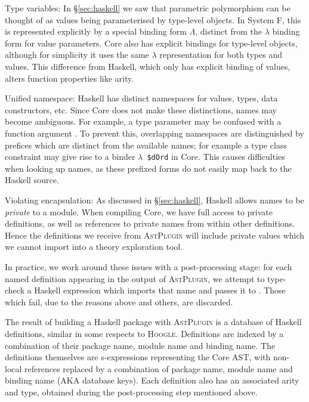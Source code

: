 \begin{description}
  \item{Type variables}: In \S \ref{sec:haskell} we saw that parametric polymorphism can be thought of as values being parameterised by type-level objects. In System F, this is represented explicitly by a special binding form $\Lambda$, distinct from the $\lambda$ binding form for value parameters. Core also has explicit bindings for type-level objects, although for simplicity it uses the same $\lambda$ representation for both types and values. This difference from Haskell, which only has explicit binding of values, alters function properties like arity.

  \item{Unified namespace}: Haskell has distinct namespaces for values, types, data constructors, etc. Since Core does not make these distinctions, names may become ambiguous. For example, a type parameter  may be confused with a function argument . To prevent this, overlapping namespaces are distinguished by prefices which are distinct from the available names; for example a type class constraint  may give rise to a binder \texttt{$\lambda$ \$dOrd} in Core. This causes difficulties when looking up names, as these prefixed forms do not easily map back to the Haskell source.

  \item{Violating encapsulation}: As discussed in \S \ref{sec:haskell}, Haskell allows names to be \emph{private} to a module. When compiling Core, we have full access to private definitions, as well as references to private names from within other definitions. Hence the definitions we receive from \textsc{AstPlugin} will include private values which we cannot import into a theory exploration tool.
\end{description}

In practice, we work around these issues with a post-processing stage: for each named definition appearing in the output of \textsc{AstPlugin}, we attempt to type-check a Haskell expression which imports that name and passes it to \qspec{}. Those which fail, due to the reasons above and others, are discarded.

The result of building a Haskell package with \textsc{AstPlugin} is a database of Haskell definitions, similar in some respects to \textsc{Hoogle}. Definitions are indexed by a combination of their package name, module name and binding name. The definitions themselves are s-expressions representing the Core AST, with non-local references replaced by a combination of package name, module name and binding name (AKA database keys). Each definition also has an associated arity and type, obtained during the post-processing step mentioned above.

